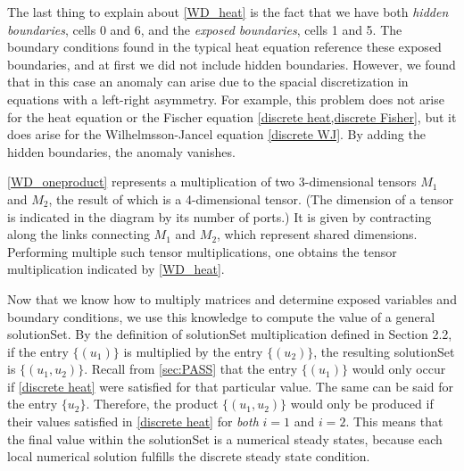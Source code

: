 \documentclass[11pt]{article}
\begin{document}
The last thing to explain about \cref{WD_heat} is the fact that we have both \emph{hidden boundaries}, cells 0 and 6, and the \emph{exposed boundaries}, cells 1 and 5. The boundary conditions found in the typical heat equation reference these exposed boundaries, and at first we did not include hidden boundaries. However, we found that in this case an anomaly can arise due to the spacial discretization in equations with a left-right asymmetry. For example, this problem does not arise for the heat equation or the Fischer equation \cref{discrete heat,discrete Fisher}, but it does arise for the Wilhelmsson-Jancel equation \cref{discrete WJ}. By adding the hidden boundaries, the anomaly vanishes.

\cref{WD_oneproduct} represents a multiplication of two 3-dimensional tensors $M_1$ and $M_2$, the result of which is a 4-dimensional tensor. (The dimension of a tensor is indicated in the diagram by its number of ports.) It is given by contracting along the links connecting $M_1$ and $M_2$, which represent shared dimensions. Performing multiple such tensor multiplications, one obtains the tensor multiplication indicated by \cref{WD_heat}.


\begin{figure*}
\caption{Wiring diagram for a single product with 3 exposed variables and 4 total variables}
\label{WD_oneproduct}
\begin{center}
\end{center}
\end{figure*}

Now that we know how to multiply matrices and determine exposed variables and boundary conditions, we use this knowledge to compute the value of a general solutionSet.  By the definition of solutionSet multiplication defined in Section 2.2, if the entry $\{(u_1)\}$ is multiplied by the entry $\{(u_2)\}$, the resulting solutionSet is $\{(u_1, u_2)\}$. Recall from \cref{sec:PASS} that the entry $\{(u_1)\}$ would only occur if \cref{discrete heat} were satisfied for that particular value. The same can be said for the entry $\{u_2\}$. Therefore, the product $\{(u_1, u_2)\}$ would only be produced if their values satisfied in \cref{discrete heat} for \textit{both} $i = 1$ and $i = 2$. This means that the final value within the solutionSet is a numerical steady states, because each local numerical solution fulfills the discrete steady state condition.
\end{document}
